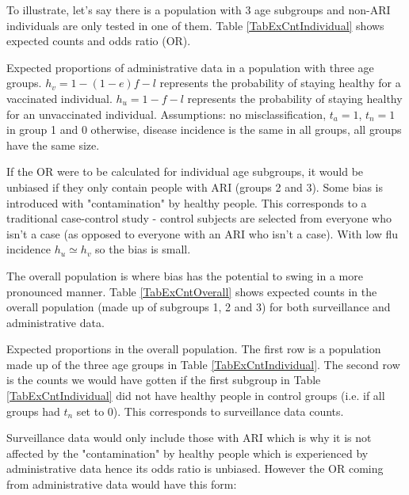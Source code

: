 \documentclass[11pt]{article}
\begin{document}
To illustrate, let's say there is a population with 3 age subgroups and non-ARI individuals are only tested in one of them. Table \ref{TabExCntIndividual} shows expected counts and odds ratio (OR).

\begin{table}[h]
\centering
\caption{
Expected proportions of administrative data in a population with three age groups. $h_v = 1 - (1-e)f - l$ represents the probability of staying healthy for a vaccinated individual. $h_u = 1 - f - l$ represents the probability of staying healthy for an unvaccinated individual.
Assumptions: no misclassification, $t_a=1$, $t_n=1$ in group 1 and 0 otherwise, disease incidence is the same in all groups, all groups have the same size. 
 \label{TabExCntIndividual}
}
	
\end{table}

If the OR were to be calculated for individual age subgroups, it would be unbiased if they only contain people with ARI (groups 2 and 3). Some bias is introduced with "contamination" by healthy people. This corresponds to a traditional case-control study - control subjects are selected from everyone who isn't a case (as opposed to everyone with an ARI who isn't a case). With low flu incidence $h_u \simeq h_v$ so the bias is small. 

The overall population is where bias has the potential to swing in a more pronounced manner. Table \ref{TabExCntOverall} shows expected counts in the overall population (made up of subgroups 1, 2 and 3) for both surveillance and administrative data.

\begin{table}[h]
\centering
\caption{
Expected proportions in the overall population. The first row is a population made up of the three age groups in Table \ref{TabExCntIndividual}. The second row is the counts we would have gotten if the first subgroup in Table \ref{TabExCntIndividual} did not have healthy people in control groups (i.e. if all groups had $t_n$ set to 0). This corresponds to surveillance data counts. \label{TabExCntOverall}
}
	
\end{table}

Surveillance data would only include those with ARI which is why it is not affected by the "contamination" by healthy people which is experienced by administrative data hence its odds ratio is unbiased. However the OR coming from administrative data would have this form:
\end{document}
